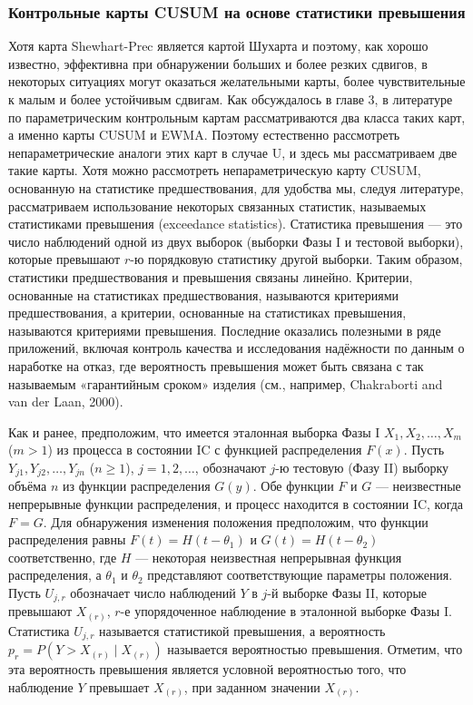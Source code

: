\subsubsection{Контрольные карты CUSUM на основе статистики превышения}
Хотя карта Shewhart-Prec является картой Шухарта и поэтому, как хорошо известно, эффективна при обнаружении больших и более резких сдвигов, в некоторых ситуациях могут оказаться желательными карты, более чувствительные к малым и более устойчивым сдвигам. Как обсуждалось в главе 3, в литературе по параметрическим контрольным картам рассматриваются два класса таких карт, а именно карты CUSUM и EWMA. Поэтому естественно рассмотреть непараметрические аналоги этих карт в случае U, и здесь мы рассматриваем две такие карты. Хотя можно рассмотреть непараметрическую карту CUSUM, основанную на статистике предшествования, для удобства мы, следуя литературе, рассматриваем использование некоторых связанных статистик, называемых статистиками превышения (exceedance statistics). Статистика превышения --- это число наблюдений одной из двух выборок (выборки Фазы I и тестовой выборки), которые превышают \(r\)-ю порядковую статистику другой выборки. Таким образом, статистики предшествования и превышения связаны линейно. Критерии, основанные на статистиках предшествования, называются критериями предшествования, а критерии, основанные на статистиках превышения, называются критериями превышения. Последние оказались полезными в ряде приложений, включая контроль качества и исследования надёжности по данным о наработке на отказ, где вероятность превышения может быть связана с так называемым «гарантийным сроком» изделия (см., например, Chakraborti and van der Laan, 2000).

Как и ранее, предположим, что имеется эталонная выборка Фазы I \(X_1, X_2, \ldots, X_m\) (\(m > 1\)) из процесса в состоянии IC с функцией распределения \(F(x)\). Пусть \(Y_{j1}, Y_{j2}, \ldots, Y_{jn}\) (\(n \ge 1\)), \(j = 1, 2, \ldots\), обозначают \(j\)-ю тестовую (Фазу II) выборку объёма \(n\) из функции распределения \(G(y)\). Обе функции \(F\) и \(G\) --- неизвестные непрерывные функции распределения, и процесс находится в состоянии IC, когда \(F = G\). Для обнаружения изменения положения предположим, что функции распределения равны \(F(t) = H(t - \theta_1)\) и \(G(t) = H(t - \theta_2)\) соответственно, где \(H\) --- некоторая неизвестная непрерывная функция распределения, а \(\theta_1\) и \(\theta_2\) представляют соответствующие параметры положения. Пусть \(U_{j,r}\) обозначает число наблюдений \(Y\) в \(j\)-й выборке Фазы II, которые превышают \(X_{(r)}\), \(r\)-е упорядоченное наблюдение в эталонной выборке Фазы I. Статистика \(U_{j,r}\) называется статистикой превышения, а вероятность \(p_r = P\left( Y > X_{(r)} \mid X_{(r)} \right)\) называется вероятностью превышения. Отметим, что эта вероятность превышения является условной вероятностью того, что наблюдение \(Y\) превышает \(X_{(r)}\), при заданном значении \(X_{(r)}\).

